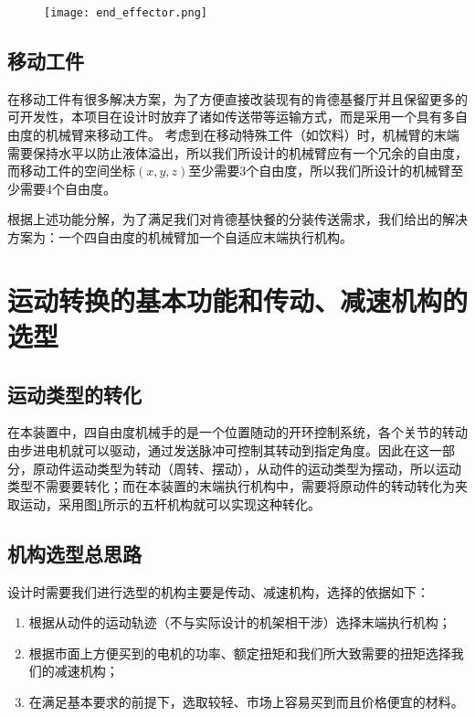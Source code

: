 \begin{figure}[!htp]
    \centering
    \texttt{[image: end\_effector.png]}
    \label{fig:endeffector}
\end{figure}
\subsection{移动工件}

在移动工件有很多解决方案，为了方便直接改装现有的肯德基餐厅并且保留更多的可开发性，本项目在设计时放弃了诸如传送带等运输方式，而是采用一个具有多自由度的机械臂来移动工件。
考虑到在移动特殊工件（如饮料）时，机械臂的末端需要保持水平以防止液体溢出，所以我们所设计的机械臂应有一个冗余的自由度，而移动工件的空间坐标$(x, y, z)$至少需要3个自由度，所以我们所设计的机械臂至少需要4个自由度。

\hfill

根据上述功能分解，为了满足我们对肯德基快餐的分装传送需求，我们给出的解决方案为：一个四自由度的机械臂加一个自适应末端执行机构。

\section{运动转换的基本功能和传动、减速机构的选型}

\subsection{运动类型的转化}

在本装置中，四自由度机械手的是一个位置随动的开环控制系统，各个关节的转动由步进电机就可以驱动，通过发送脉冲可控制其转动到指定角度。因此在这一部分，原动件运动类型为转动（周转、摆动），从动件的运动类型为摆动，所以运动类型不需要要转化；而在本装置的末端执行机构中，需要将原动件的转动转化为夹取运动，采用图\ref{fig:endeffector}所示的五杆机构就可以实现这种转化。

\subsection{机构选型总思路}

设计时需要我们进行选型的机构主要是传动、减速机构，选择的依据如下：
\begin{enumerate}
    \item   根据从动件的运动轨迹（不与实际设计的机架相干涉）选择末端执行机构；
    \item   根据市面上方便买到的电机的功率、额定扭矩和我们所大致需要的扭矩选择我们的减速机构；
    \item   在满足基本要求的前提下，选取较轻、市场上容易买到而且价格便宜的材料。
\end{enumerate}


